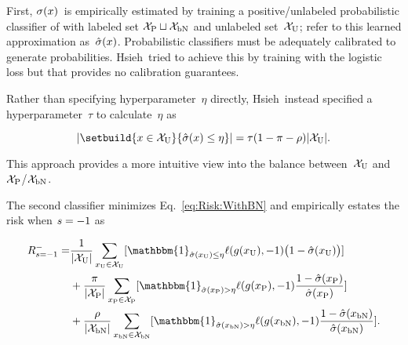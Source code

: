 First, $\sigma(x)$~is empirically estimated by training a positive\-/unlabeled probabilistic classifier of with labeled set ${\mathcal{X}_{\textnormal{P}} \sqcup \mathcal{X}_{\textnormal{bN}}}$ and unlabeled set~$\mathcal{X}_{\textnormal{U}}$; refer to this learned approximation as~$\hat{\sigma}(x)$.  Probabilistic classifiers must be adequately calibrated to generate probabilities.  Hsieh\etal\ tried to achieve this by training with the logistic loss but that provides no calibration guarantees.~\cite{Guo:2017}

Rather than specifying hyperparameter~$\eta$ directly, Hsieh\etal\ instead specified a hyperparameter~$\tau$ to calculate~$\eta$ as

\begin{equation}\label{eq:EtaCalculation}
  \abs{\setbuild{\X \in \utrain}{\hsigX \leq \eta}} = \tau (1 - \prior - \plabel)\abs{\utrain} \text{.}
\end{equation}

\noindent
This approach provides a more intuitive view into the balance between~$\mathcal{X}_{\textnormal{U}}$ and $\mathcal{X}_{\textnormal{P}}$/$\mathcal{X}_{\textnormal{bN}}$.

The second classifier minimizes Eq.~\eqref{eq:Risk:WithBN} and empirically estates the risk when ${s = {-}1}$ as

\begin{equation}\label{eq:EmpRisk:PUbN:Latent}
  \begin{aligned}
    \smrisk = &\frac{1}{\abs{\utrain}} \sum_{\xvar{U} \in \utrain} \sbrack{\mathbbm{1}_{\hsig(\xvar{U}) \leq \eta} \floss{\dec(\xvar{U})}{\ncls} \big(1 - \hsig(\xvar{U})\big)} \\
              &+\frac{\prior}{\abs{\ptrain}} \sum_{\xvar{P} \in \ptrain} \sbrack{\mathbbm{1}_{\hsig(\xvar{P}) > \eta} \floss{\dec(\xvar{P})}{\ncls} \frac{1 - \hsig(\xvar{P})}{\hsig(\xvar{P})}} \\
              &+\frac{\plabel}{\abs{\bntrain}} \sum_{\xvar{bN} \in \bntrain} \sbrack{\mathbbm{1}_{\hsig(\xvar{bN}) > \eta} \floss{\dec(\xvar{bN})}{\ncls} \frac{1 - \hsig(\xvar{bN})}{\hsig(\xvar{bN})}} \text{.}
  \end{aligned}
\end{equation}
